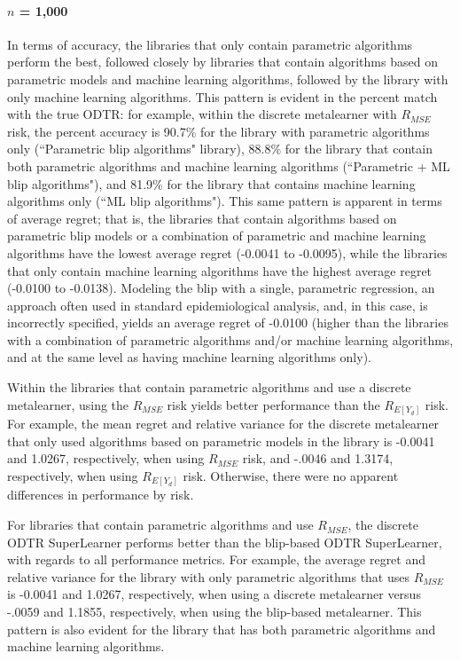 \documentclass[a4paper,12pt]{article}
\begin{document}
\paragraph{$n$ = 1,000}

In terms of accuracy, the libraries that only contain parametric algorithms perform the best, followed closely by libraries that contain algorithms based on parametric models and machine learning algorithms, followed by the library with only machine learning algorithms. This pattern is evident in the percent match with the true ODTR: for example, within the discrete metalearner with $R_{MSE}$ risk, the percent accuracy is 90.7\% for the library with parametric algorithms only (``Parametric blip algorithms" library), 88.8\% for the library that contain both parametric algorithms and machine learning algorithms (``Parametric + ML blip algorithms"), and 81.9\% for the library that contains machine learning algorithms only (``ML blip algorithms"). This same pattern is apparent in terms of average regret; that is, the libraries that contain algorithms based on parametric blip models or a combination of parametric and machine learning algorithms have the lowest average regret (-0.0041 to -0.0095), while the libraries that only contain machine learning algorithms have the highest average regret (-0.0100 to -0.0138). Modeling the blip with a single, parametric regression, an approach often used in standard epidemiological analysis, and, in this case, is incorrectly specified, yields an average regret of -0.0100 (higher than the libraries with a combination of parametric algorithms and/or machine learning algorithms, and at the same level as having machine learning algorithms only).

Within the libraries that contain parametric algorithms and use a discrete metalearner, using the $R_{MSE}$ risk yields better performance than the $R_{E[Y_d]}$ risk. For example, the mean regret and relative variance for the discrete metalearner that only used algorithms based on parametric models in the library is -0.0041 and 1.0267, respectively, when using $R_{MSE}$ risk, and -.0046 and 1.3174, respectively, when using $R_{E[Y_d]}$ risk. Otherwise, there were no apparent differences in performance by risk.

For libraries that contain parametric algorithms and use $R_{MSE}$, the discrete ODTR SuperLearner performs better than the blip-based ODTR SuperLearner, with regards to all performance metrics. For example, the average regret and relative variance for the library with only parametric algorithms that uses $R_{MSE}$ is -0.0041 and 1.0267, respectively, when using a discrete metalearner versus -.0059 and 1.1855, respectively, when using the blip-based metalearner. This pattern is also evident for the library that has both parametric algorithms and machine learning algorithms.
\end{document}
